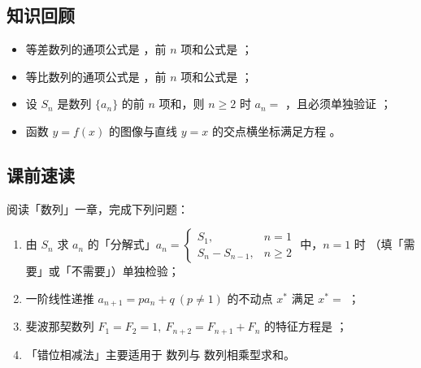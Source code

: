 \begin{preview}
\subsection*{知识回顾}
\begin{itemize}
  \item 等差数列的通项公式是 \blank，前 $n$ 项和公式是 \blank；
  \item 等比数列的通项公式是 \blank，前 $n$ 项和公式是 \blank；
  \item 设 $S_n$ 是数列 $\{a_n\}$ 的前 $n$ 项和，则 $n\ge2$ 时 $a_n=$ \blank，且必须单独验证 \blank；
  \item 函数 $y=f(x)$ 的图像与直线 $y=x$ 的交点横坐标满足方程 \blank。
\end{itemize}

\subsection*{课前速读}
阅读「数列」一章，完成下列问题：
\begin{enumerate}
  \item 由 $S_n$ 求 $a_n$ 的「分解式」$a_n=\begin{cases}S_1,&n=1\\ S_n-S_{n-1},&n\ge2\end{cases}$ 中，$n=1$ 时 \blank（填「需要」或「不需要」）单独检验；
  \item 一阶线性递推 $a_{n+1}=pa_n+q\ (p\ne1)$ 的不动点 $x^*$ 满足 $x^*=$ \blank；
  \item 斐波那契数列 $F_1=F_2=1,\ F_{n+2}=F_{n+1}+F_n$ 的特征方程是 \blank；
  \item 「错位相减法」主要适用于 \blank 数列与 \blank 数列相乘型求和。
\end{enumerate}
\end{preview}


